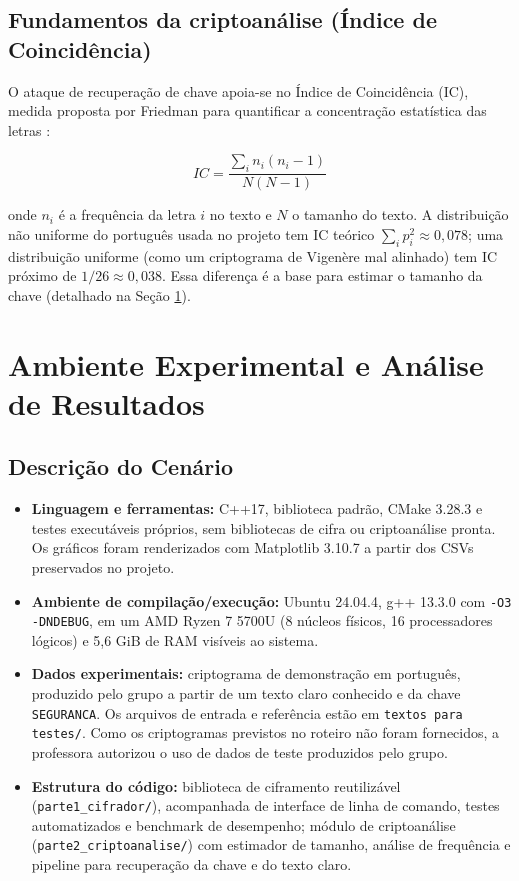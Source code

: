 \documentclass[conference]{IEEEtran}
\begin{document}
\subsection{Fundamentos da criptoanálise (Índice de Coincidência)}

O ataque de recuperação de chave apoia-se no Índice de Coincidência
(IC), medida proposta por Friedman para quantificar a concentração
estatística das letras \cite{friedman}:

\begin{equation}
IC = \frac{\sum_i n_i (n_i - 1)}{N (N - 1)}
\end{equation}

onde $n_i$ é a frequência da letra $i$ no texto e $N$ o tamanho do
texto. A distribuição não uniforme do português usada no projeto tem
IC teórico $\sum_i p_i^2 \approx 0{,}078$; uma distribuição uniforme
(como um criptograma de Vigenère mal alinhado) tem IC próximo de
$1/26 \approx 0{,}038$. Essa diferença é a base para estimar o
tamanho da chave (detalhado na Seção \ref{sec:experimental}).

\section{Ambiente Experimental e Análise de Resultados}
\label{sec:experimental}

\subsection{Descrição do Cenário}

\begin{itemize}
\item \textbf{Linguagem e ferramentas:} C++17, biblioteca padrão,
  CMake 3.28.3 e testes executáveis próprios, sem bibliotecas de cifra
  ou criptoanálise pronta. Os gráficos foram renderizados com
  Matplotlib 3.10.7 a partir dos CSVs preservados no projeto.
\item \textbf{Ambiente de compilação/execução:} Ubuntu 24.04.4,
  g++ 13.3.0 com \texttt{-O3 -DNDEBUG}, em um AMD Ryzen 7 5700U
  (8 núcleos físicos, 16 processadores lógicos) e 5,6 GiB de RAM
  visíveis ao sistema.
\item \textbf{Dados experimentais:} criptograma de demonstração em
  português, produzido pelo grupo a partir de um texto claro conhecido
  e da chave \texttt{SEGURANCA}. Os arquivos de entrada e referência
  estão em \texttt{textos para testes/}. Como os criptogramas previstos no
  roteiro não foram fornecidos, a professora autorizou o uso de dados de
  teste produzidos pelo grupo.
\item \textbf{Estrutura do código:} biblioteca de ciframento
  reutilizável (\texttt{parte1\_cifrador/}), acompanhada de interface
  de linha de comando, testes automatizados e benchmark de desempenho;
  módulo de criptoanálise
  (\texttt{parte2\_criptoanalise/}) com estimador de tamanho, análise
  de frequência e pipeline para recuperação da chave e do texto claro.
\end{itemize}
\end{document}
